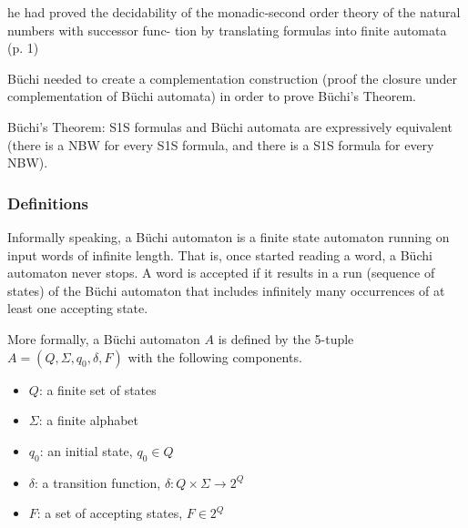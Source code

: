he had proved the decidability of the monadic-second order theory of the natural numbers with successor func- tion by translating formulas into finite automata~\cite{vardi2007automata} (p. 1)


Büchi needed to create a complementation construction (proof the closure under complementation of Büchi automata) in order to prove Büchi's Theorem.

Büchi's Theorem: S1S formulas and Büchi automata are expressively equivalent (there is a NBW for every S1S formula, and there is a S1S formula for every NBW).

\subsubsection{Definitions}
Informally speaking, a Büchi automaton is a finite state automaton running on input words of infinite length. That is, once started reading a word, a Büchi automaton never stops. A word is accepted if it results in a run (sequence of states) of the Büchi automaton that includes infinitely many occurrences of at least one accepting state.

More formally, a Büchi automaton $A$ is defined by the 5-tuple $A = (Q, \Sigma, q_0, \delta, F)$ with the following components.
\begin{itemize}
\item $Q$: a finite set of states
\item $\Sigma$: a finite alphabet
\item $q_0$: an initial state, $q_0 \in Q$
\item $\delta$: a transition function, $\delta: Q \times \Sigma \rightarrow 2^Q$ %
\item $F$: a set of accepting states, $F \in 2^Q$
\end{itemize}


